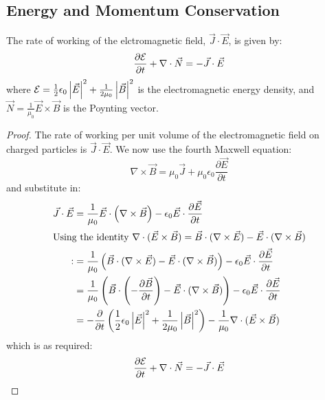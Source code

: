 \documentclass[../Main.tex]{subfiles}
\begin{document}
\subsection{Energy and Momentum Conservation}
\begin{theorem}
    The rate of working of the elctromagnetic field, $\vec{J} \cdot \vec{E}$, is given by:
    \begin{equation*}
        \frac{\partial \mathcal{E}}{\partial t} + \nabla \cdot \vec{N} = -\vec{J} \cdot \vec{E}
    \end{equation*}
    where $\mathcal{E} = \frac12 \epsilon_0 \left|\vec{E}\right|^2 + \frac1{2\mu_0} \left|\vec{B}\right|^2$ is the electromagnetic energy density, and $\vec{N} = \frac1{\mu_0} \vec{E} \times \vec{B}$ is the Poynting vector.
    \label{thmPoynting}
\end{theorem}
\begin{proof}
    The rate of working per unit volume of the electromagnetic field on charged particles is $\vec{J} \cdot \vec{E}$. We now use the fourth Maxwell equation:
    \begin{equation*}
        \nabla \times \vec{B} = \mu_0 \vec{J} + \mu_0 \epsilon_0 \frac{\partial \vec{E}}{\partial t}
    \end{equation*}
    and substitute in:
    \begin{align*}
        \vec{J} \cdot \vec{E} &= \frac1{\mu_0} \vec{E} \cdot \left(\nabla \times \vec{B}\right) - \epsilon_0 \vec{E} \cdot \frac{\partial \vec{E}}{\partial t} \\
        \intertext{Using the identity $\nabla \cdot (\vec{E} \times \vec{B}) = \vec{B} \cdot (\nabla \times \vec{E}) - \vec{E} \cdot (\nabla \times \vec{B})$}:
        &= \frac1{\mu_0} \left(\vec{B} \cdot (\nabla \times \vec{E}) - \vec{E} \cdot (\nabla \times \vec{B})\right) - \epsilon_0 \vec{E} \cdot \frac{\partial \vec{E}}{\partial t} \\
        &= \frac1{\mu_0} \left(\vec{B} \cdot \left(-\frac{\partial \vec{B}}{\partial t}\right) - \vec{E} \cdot (\nabla \times \vec{B})\right) - \epsilon_0 \vec{E} \cdot \frac{\partial \vec{E}}{\partial t} \\
        &= -\frac{\partial }{\partial t} \left(\frac12 \epsilon_0 \left|\vec{E}\right|^2 + \frac1{2\mu_0} \left|\vec{B}\right|^2\right) - \frac1{\mu_0} \nabla \cdot (\vec{E} \times \vec{B})
    \end{align*}
    which is as required:
    \begin{equation*}
        \frac{\partial \mathcal{E}}{\partial t} + \nabla \cdot \vec{N} = -\vec{J} \cdot \vec{E}
    \end{equation*}
\end{proof}
\end{document}
